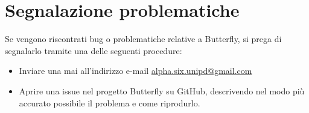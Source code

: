 \section{Segnalazione problematiche}

Se vengono riscontrati bug o problematiche relative a Butterfly, si prega di segnalarlo
tramite una delle seguenti procedure:
\begin{itemize}
    \item Inviare una mai all'indirizzo e-mail \href{mailto:alpha.six.unipd@gmail.com}{alpha.six.unipd@gmail.com}
    \item Aprire una issue nel progetto Butterfly su GitHub, descrivendo nel modo più accurato possibile il problema e come riprodurlo.
\end{itemize}
